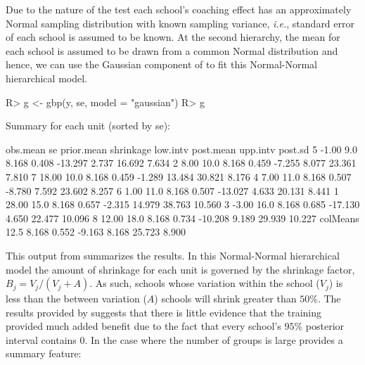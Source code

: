 \documentclass[article]{jss}
\begin{document}
Due to the nature of the test each school's coaching effect has an approximately Normal sampling distribution with known sampling variance, \emph{i.e.}, standard error of each school is assumed to be known. At the second hierarchy, the mean for each school is assumed to be drawn from a common Normal distribution and hence, we can use the Gaussian component of  to fit this Normal-Normal hierarchical model.


\begin{CodeChunk}
\begin{CodeInput}
R> g <- gbp(y, se, model = "gaussian")
R> g
\end{CodeInput}
\begin{CodeOutput}
Summary for each unit (sorted by se):

         obs.mean   se prior.mean shrinkage low.intv post.mean upp.intv post.sd
5           -1.00  9.0      8.168     0.408  -13.297     2.737   16.692   7.634
2            8.00 10.0      8.168     0.459   -7.255     8.077   23.361   7.810
7           18.00 10.0      8.168     0.459   -1.289    13.484   30.821   8.176
4            7.00 11.0      8.168     0.507   -8.780     7.592   23.602   8.257
6            1.00 11.0      8.168     0.507  -13.027     4.633   20.131   8.441
1           28.00 15.0      8.168     0.657   -2.315    14.979   38.763  10.560
3           -3.00 16.0      8.168     0.685  -17.130     4.650   22.477  10.096
8           12.00 18.0      8.168     0.734  -10.208     9.189   29.939  10.227
colMeans          12.5      8.168     0.552   -9.163     8.168   25.723   8.900
\end{CodeOutput}
\end{CodeChunk}
This output from  summarizes the results. In this Normal-Normal hierarchical model the amount of shrinkage for each unit is governed by the shrinkage factor, $B_j = V_j/(V_j + A)$. As such, schools whose variation within the school ($V_{j}$) is less than the between variation ($A$) schools will shrink greater than $50\%$. The results provided by  suggests that there is little evidence that the training provided much added benefit due to the fact that every school's $95\%$ posterior interval contains 0. In the case where the number of groups is large  provides a summary feature:
\end{document}
